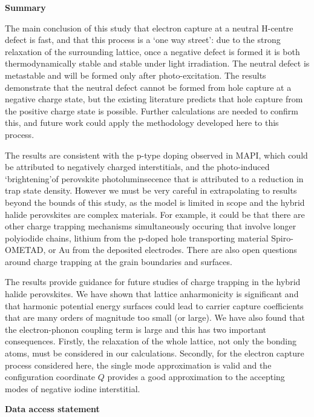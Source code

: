 \textbf{Summary}

The main conclusion of this study that electron capture at a neutral H-centre defect is fast, and that this process is a `one way street': due to the strong relaxation of the surrounding lattice, once a negative defect is formed it is both thermodynamically stable and stable under light irradiation.
The neutral defect is metastable and will be formed only after photo-excitation. The results demonstrate that the neutral defect cannot be formed from hole capture at a negative charge state, but the existing literature predicts that hole capture from the positive charge state is possible. Further calculations are needed to confirm this, and future work could apply the methodology developed here to this process. 

The results are consistent with the p-type doping observed in MAPI, which could be attributed to negatively charged interstitials, and the photo-induced `brightening'of perovskite photoluminsecence that is attributed to a reduction in trap state density.
However we must be very careful in extrapolating to results beyond the bounds of this study,
as the model is limited in scope and the hybrid halide perovskites are complex materials. 
For example, it could be that there are other charge trapping mechanisms simultaneously occuring that involve longer polyiodide chains, lithium from the p-doped hole transporting material Spiro-OMETAD, or Au from the deposited electrodes. There are also open questions around charge trapping at the grain boundaries and surfaces.

The results provide guidance for future studies of charge trapping in the hybrid halide perovskites.
We have shown that lattice anharmonicity is significant and that harmonic potential energy surfaces could lead to carrier capture coefficients that are many orders of magnitude too small (or large).
We have also found that the electron-phonon coupling term is large and this has two important consequences. Firstly, the relaxation of the whole lattice, not only the bonding atoms, must be considered in our calculations.
Secondly, for the electron capture process considered here, the single mode approximation is valid and the configuration coordinate $Q$ provides a good approximation to the accepting modes of negative iodine interstitial.

\textbf{Data access statement}

